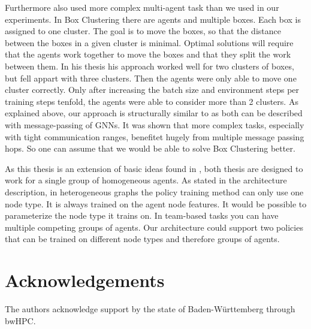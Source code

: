 Furthermore \citet{RobinRuede2021} also used more complex multi-agent task than we used in our experiments. In Box Clustering there are agents and multiple boxes. Each box is assigned to one cluster. The goal is to move the boxes, so that the distance between the boxes in a given cluster is minimal. Optimal solutions will require that the agents work together to move the boxes and that they split the work between them. In his thesis his approach worked well for two clusters of boxes, but fell appart with three clusters. Then the agents were only able to move one cluster correctly. Only after increasing the batch size and environment steps per training steps tenfold, the agents were able to consider more than 2 clusters. As explained above, our approach is structurally similar to \citet{RobinRuede2021} as both can be described with message-passing of GNNs. It was shown that more complex tasks, especially with tight communication ranges, benefitet hugely from multiple message passing hops. So one can assume that we would be able to solve Box Clustering better.\par

As this thesis is an extension of basic ideas found in \citet{RobinRuede2021}, both thesis are designed to work for a single group of homogeneous agents. As stated in the architecture description, in heterogeneous graphs the policy training method can only use one node type. It is always trained on the agent node features. It would be possible to parameterize the node type it trains on. In team-based tasks you can have multiple competing groups of agents. Our architecture could support two policies that can be trained on different node types and therefore groups of agents. \par

\iffalse
Data pre processing:
Wobei ein MLP Encoder bei uns auch was ist, was man ausprobieren kann. Theoretisch ist das nicht notwendig, aber praktisch spart man sich damit vielleicht ein oder zwei GNN Blöcke. Das und andere initiale Encodings kannst du gerne als Future work reintun. Dazu gibt es einen ganzen Satz Paper, die ihren Input bspw. gelernt, mittels Sinuiden oder Random Fourier Features encoden, bevor das eigentliche Netz anfängt. Wenn du magst schick ich dir zwei drei Referenzen, die du in dem Kontext zitieren kannst

https://arxiv.org/pdf/2003.08934.pdf Macht positional encoding für "synthesizing novel views of complex scenes". Figure 4 zeigt ein Beispiel, wie die Methode mit und ohne Encoding aussieht.
https://arxiv.org/pdf/2006.09661.pdf Nutzen sinus-Aktivierungen für implicit representations. Das ist bspw. sowas, wie ein Bild als Funktion zu Enkodieren ("B(x,y)=(r,g,b)") und das in den Gewichten eines neuronalen Netzes zu lernen
https://arxiv.org/abs/2006.10739 Zeigt, dass ein Fourier Feature Mapping dazu führt, dass Netze viel besser darin werden, Details in örtlich benachbarten Bereichen auf Bildern zu differenzieren.

\fi

\section{Acknowledgements}
The authors acknowledge support by the state of Baden-Württemberg through bwHPC.